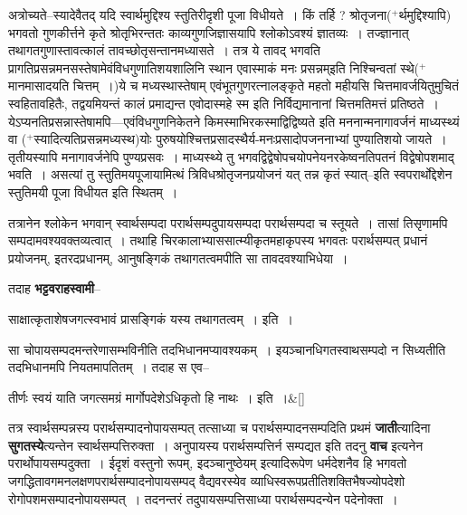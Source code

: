 \documentclass[article,12pt,a4paper]{memoir}
\newcommand{\add}[1]{($^{+}$#1)}
\begin{document}
	  \pstart अत्रोच्यते--स्यादेवैतद् यदि स्वार्थमुद्दिश्य स्तुतिरीदृशी पूजा विधीयते । किं तर्हि ? श्रोतृजना\add{र्थमुद्दिश्यापि} भगवतो गुणकीर्त्तने कृते श्रोतृभिरन्ततः काव्यगुणजिज्ञासयापि श्लोकोऽवश्यं ज्ञातव्यः । तज्ज्ञानात् तथागतगुणास्तावत्कालं तावच्छोतृसन्तानमध्यासते । तत्र ये तावद् भगवति प्रागतिप्रसन्नमनसस्तेषामेवंविधगुणातिशयशालिनि स्थान एवास्माकं मनः प्रसन्नम्इति निश्चिन्वतां स्थे\add{मानमासादयति चित्तम् ।}ये च मध्यस्थास्तेषाम् एवंभूतगुणरत्नालङ्कृते महतो महीयसि चित्तमावर्जयितुमुचितं स्वहितावहितैः, तद्वयमियन्तं कालं प्रमाद्यन्त एवोदास्महे स्म इति निर्विद्यमानानां चित्तमतिमत्तं प्रतिष्ठते । येऽप्यनतिप्रसन्नास्तेषामपि—एवंविधगुणनिकेतने किमस्माभिरकस्माद्विद्विष्यते इति मननान्मनागावर्जनं माध्यस्थ्यं वा \add{स्यादित्यतिप्रसन्नमध्यस्थ}योः पुरुषयोश्चित्तप्रसादस्थैर्य-मनःप्रसादोपजननाभ्यां पुण्यातिशयो जायते । तृतीयस्यापि मनागावर्जनेपि पुण्यप्रसवः । माध्यस्थ्ये तु भगवद्विद्वेषोपचयोपनेयनरकेष्वनतिपतनं विद्वेषोपशमाद् भवति । असत्यां तु स्तुतिमयपूजायामित्थं त्रिविधश्रोतृजनप्रयोजनं यत् तन्न कृतं स्यात्--इति स्वपरार्थो\leavevmode{}द्देशेन स्तुतिमयी पूजा विधीयत इति स्थितम् ।
	\pend
      

	  \pstart तत्रानेन श्लोकेन भगवान् स्वार्थसम्पदा परार्थसम्पदुपायसम्पदा परार्थसम्पदा च स्तूयते । तासां तिसृणामपि सम्पदामवश्यवक्तव्यत्वात् । तथाहि चिरकालाभ्याससात्म्यीकृतमहाकृपस्य भगवतः परार्थसम्पत् प्रधानं प्रयोजनम्, इतरदप्रधानम्, आनुषङ्गिकं तथागतत्वमपीति सा तावदवश्याभिधेया ।
	\pend
      

	  \pstart तदाह \textbf{भट्टवराहस्वामी}--
	\pend
      

	  \pstart साक्षात्कृताशेषजगत्स्वभावं प्रासङ्गिकं यस्य तथागतत्वम् । इति ।
	\pend
      

	  \pstart सा चोपायसम्पदमन्तरेणासम्भविनीति तदभिधानमप्यावश्यकम् । इयञ्चानधिगतस्वाथसम्पदो न सिध्यतीति तदभिधानमपि नियतमापतितम् । तदाह स एव--
	\pend
      
	  \bigskip
	  \begingroup
	
	    
	    \stanza[\smallbreak]
	तीर्णः स्वयं याति जगत्समग्रं मार्गोपदेशेऽधिकृतो हि नाथः । इति ।\&[\smallbreak]


	
	  \endgroup
	

	  \pstart तत्र स्वार्थसम्पन्नस्य परार्थसम्पादनोपायसम्पत् तत्साध्या च परार्थसम्पादनसम्पदिति प्रथमं \textbf{जाती}त्यादिना \textbf{सुगतस्ये}त्यन्तेन स्वार्थसम्पत्तिरुक्ता । अनुपायस्य परार्थसम्पत्तिर्न सम्पद्यत \leavevmode{} इति तदनु \textbf{वाच} इत्यनेन परार्थोपायसम्पदुक्ता । ईदृशं वस्तुनो रूपम्, इदञ्चानुष्ठेयम् इत्यादिरूपेण धर्मदेशनैव हि भगवतो जगद्धितावगमनलक्षणपरार्थसम्पादनोपायसम्पद् वैद्यवरस्येव व्याधिस्वरूपप्रतीतिशक्तिभैषज्योपदेशो रोगोपशमसम्पादनोपायसम्पत् । तदनन्तरं तदुपायसम्पत्तिसाध्या परार्थसम्पदन्येन पदेनोक्ता ।
	\pend
      
\end{document}
